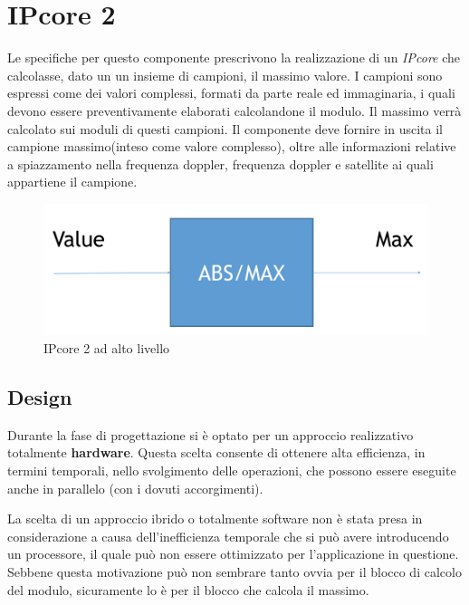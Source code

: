 \documentclass[12pt,a4paper,twoside,openany]{book}
\begin{document}
\chapter{IPcore 2}
Le specifiche per questo componente prescrivono la realizzazione di un \textit{IPcore} che calcolasse, dato un un insieme di campioni, il massimo valore. I campioni sono espressi come dei valori complessi, formati da parte reale ed immaginaria, i quali devono essere preventivamente elaborati calcolandone il modulo. Il massimo verrà calcolato sui moduli di questi campioni. Il componente deve fornire in uscita il campione massimo(inteso come valore complesso), oltre alle informazioni relative a spiazzamento nella frequenza doppler, frequenza doppler e satellite ai quali appartiene il campione.

\begin{figure}[hb]
\begin{center}
\includegraphics[scale=0.6, keepaspectratio]{immagini/ipcore2_toplevel}
\caption{IPcore 2 ad alto livello}
\label{ipcore2_top}
\end{center}
\end{figure}
\clearpage

\section{Design}
Durante la fase di progettazione si è optato per un approccio realizzativo totalmente \textbf{hardware}. Questa scelta consente di ottenere alta efficienza, in termini temporali, nello svolgimento delle operazioni, che possono essere eseguite anche in parallelo (con i dovuti accorgimenti). 

La scelta di un approccio ibrido o totalmente software non è stata presa in considerazione a causa dell'inefficienza temporale che si può avere introducendo un processore, il quale può non essere ottimizzato per l'applicazione in questione. Sebbene questa motivazione può non sembrare tanto ovvia per il blocco di calcolo del modulo, sicuramente lo è per il blocco che calcola il massimo.
\end{document}
